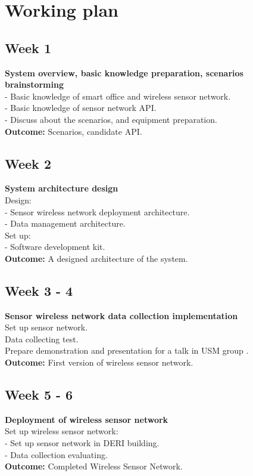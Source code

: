 \documentclass[a4paper]{llncs}
\newcommand{\head}[1]{\textnormal {\textbf{#1}}}
\begin{document}
\section{Working plan}
\subsection{Week 1}
\head{System overview, basic knowledge preparation, scenarios brainstorming}\\
- Basic knowledge of smart office and wireless sensor network.\\
- Basic knowledge of sensor network API.\\   
- Discuss about the scenarios, and equipment preparation.\\
\head{Outcome: } Scenarios, candidate API.
\subsection{Week 2}
\head{System architecture design}\\
Design:\\
- Sensor wireless network deployment architecture.\\
- Data management architecture.\\ 
Set up:\\
- Software development kit.\\
\head{Outcome:} A designed architecture of the system.
\subsection{Week 3 - 4}
\head{Sensor wireless network data collection implementation}\\
Set up sensor network.\\
Data collecting test.\\
Prepare demonstration and presentation for a talk in USM group .\\
\head{Outcome: }First version of wireless sensor network.
\subsection{Week 5 - 6}
\head{Deployment of wireless sensor network}\\
Set up wireless sensor network:\\
 - Set up sensor network in DERI building.\\
 - Data collection evaluating.\\
\head{Outcome: }Completed Wireless Sensor Network.
\end{document}
